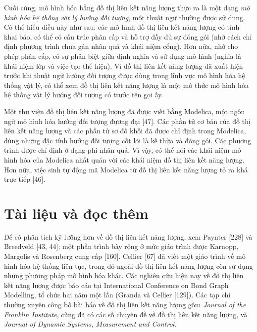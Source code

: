Cuối cùng, mô hình hóa bằng đồ thị liên kết năng lượng thực ra là một dạng \emph{mô hình hóa hệ thống vật lý hướng đối tượng}, một thuật ngữ thường được sử dụng. Có thể hiểu điều này như sau: các mô hình đồ thị liên kết năng lượng có tính khai báo, có thể có cấu trúc phân cấp và hỗ trợ đầy đủ sự đóng gói (nhờ cách chỉ định phương trình chưa gán nhân quả và khái niệm cổng). Hơn nữa, nhờ cho phép phân cấp, có sự phân biệt giữa định nghĩa và sử dụng mô hình (nghĩa là khái niệm lớp và việc tạo thể hiện). Vì đồ thị liên kết năng lượng đã xuất hiện trước khi thuật ngữ hướng đối tượng được dùng trong lĩnh vực mô hình hóa hệ thống vật lý, có thể xem đồ thị liên kết năng lượng là một mô thức mô hình hóa hệ thống vật lý hướng đối tượng có trước tên gọi ấy.

Một thư viện đồ thị liên kết năng lượng đã được viết bằng Modelica, một ngôn ngữ mô hình hóa hướng đối tượng đương đại [47]. Các phần tử cơ bản của đồ thị liên kết năng lượng và các phần tử sơ đồ khối đã được chỉ định trong Modelica, dùng những đặc tính hướng đối tượng cốt lõi là kế thừa và đóng gói. Các phương trình được chỉ định ở dạng phi nhân quả. Vì vậy, có thể nói các khái niệm mô hình hóa của Modelica nhất quán với các khái niệm đồ thị liên kết năng lượng. Hơn nữa, việc sinh tự động mã Modelica từ đồ thị liên kết năng lượng tỏ ra khá trực tiếp [46].

\section{Tài liệu và đọc thêm}
Để có phân tích kỹ lưỡng hơn về đồ thị liên kết năng lượng, xem Paynter [228] và Breedveld [43, 44]; một phần trình bày rộng ở mức giáo trình được Karnopp, Margolis và Rosenberg cung cấp [160]. Cellier [67] đã viết một giáo trình về mô hình hóa hệ thống liên tục, trong đó ngoài đồ thị liên kết năng lượng còn sử dụng những phương pháp mô hình hóa khác. Các nghiên cứu hiện nay về đồ thị liên kết năng lượng được báo cáo tại International Conference on Bond Graph Modelling, tổ chức hai năm một lần (Granda và Cellier [129]). Các tạp chí thường xuyên công bố bài báo về đồ thị liên kết năng lượng gồm \emph{Journal of the Franklin Institute}, cũng đã có các số chuyên đề về đồ thị liên kết năng lượng, và \emph{Journal of Dynamic Systems, Measurement and Control}.

